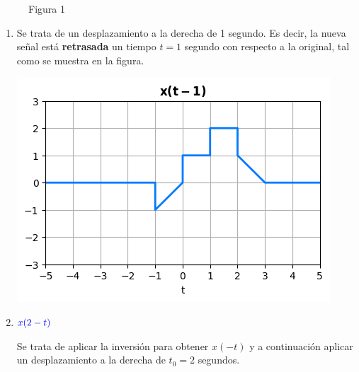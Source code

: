 \begin{enumerate}[label=\color{red}\textbf{\arabic*)}, leftmargin=*]
	\begin{figure}[h]
		\centering
		\caption*{Figura 1}
	\end{figure}

	\pagebreak

	\begin{enumerate}[label=\color{red}\alph*)]
			\item {}
			
			Se trata de un desplazamiento a la derecha de 1 segundo. Es decir, la nueva señal está \textbf{retrasada} un tiempo $t=1$ segundo con respecto a la original, tal como se muestra en la figura.
			
			\begin{center}
			\includegraphics{"Temas/Tema 1/screenshot003.png"}
			\end{center}
			
			\item $\textcolor{blue}{x(2-t)}$
			
			Se trata de aplicar la inversión para obtener $x(-t)$ y a continuación aplicar un desplazamiento a la derecha de $t_0=2$ segundos.
			

\end{enumerate}
\end{enumerate}
